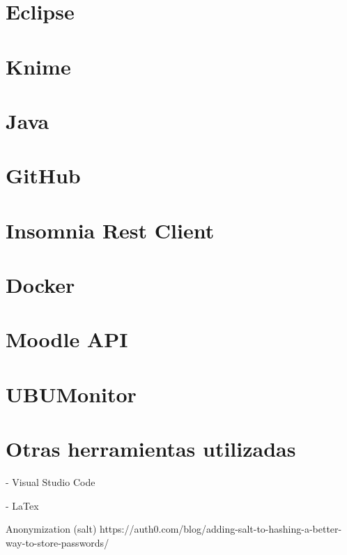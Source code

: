 

\section{Eclipse}

\section{Knime}

\section{Java}

\section{GitHub}

\section{Insomnia Rest Client}


\section{Docker}

\section{Moodle API}

\section{UBUMonitor}


\section{Otras herramientas utilizadas}

- Visual Studio Code

- LaTex



Anonymization (salt)
https://auth0.com/blog/adding-salt-to-hashing-a-better-way-to-store-passwords/